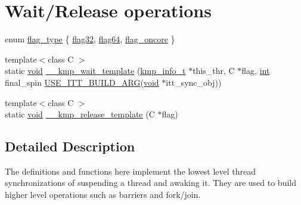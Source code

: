 \hypertarget{group__WAIT__RELEASE}{\section{Wait/\-Release operations}
\label{group__WAIT__RELEASE}
}
\begin{DoxyCompactItemize}
\item 
enum \hyperlink{group__WAIT__RELEASE_ga507a7197646f995b5529a68c1481e39b}{flag\-\_\-type} \{ \hyperlink{group__WAIT__RELEASE_gga507a7197646f995b5529a68c1481e39baa8e37e16d043d78e34da1d19387be5ba}{flag32}, 
\hyperlink{group__WAIT__RELEASE_gga507a7197646f995b5529a68c1481e39ba8b02d824728fb546d43123b8b069ed04}{flag64}, 
\hyperlink{group__WAIT__RELEASE_gga507a7197646f995b5529a68c1481e39ba9e8f1573ea73441426c6a6dda73b4e49}{flag\-\_\-oncore}
 \}
\item 
{\footnotesize template$<$class C $>$ }\\static \hyperlink{ittnotify__static_8h_af941d56e55e3c5465135b60c4d6343ed}{void} \hyperlink{group__WAIT__RELEASE_gabe62fb00e04b4d30528d441232b0e62a}{\-\_\-\-\_\-kmp\-\_\-wait\-\_\-template} (\hyperlink{kmp_8h_a194859801fe16b326efe34501a37c30a}{kmp\-\_\-info\-\_\-t} $\ast$this\-\_\-thr, C $\ast$flag, \hyperlink{ittnotify__static_8h_a8b8dcd723308a8cb5d84277c7a3fff70}{int} final\-\_\-spin \hyperlink{kmp__itt_8h_ac31864b9b5b30f5dcac5ab285ee97ae0}{U\-S\-E\-\_\-\-I\-T\-T\-\_\-\-B\-U\-I\-L\-D\-\_\-\-A\-R\-G}(\hyperlink{ittnotify__static_8h_af941d56e55e3c5465135b60c4d6343ed}{void} $\ast$itt\-\_\-sync\-\_\-obj))
\item 
{\footnotesize template$<$class C $>$ }\\static \hyperlink{ittnotify__static_8h_af941d56e55e3c5465135b60c4d6343ed}{void} \hyperlink{group__WAIT__RELEASE_ga69a3eeeb736df0221080fff120336b5a}{\-\_\-\-\_\-kmp\-\_\-release\-\_\-template} (C $\ast$flag)
\end{DoxyCompactItemize}


\subsection{Detailed Description}
The definitions and functions here implement the lowest level thread synchronizations of suspending a thread and awaking it. They are used to build higher level operations such as barriers and fork/join. 

